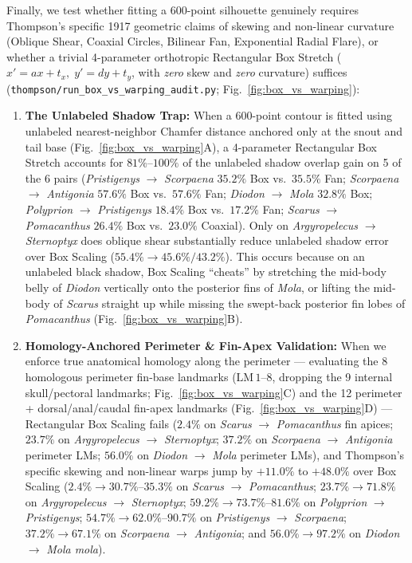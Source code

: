 \documentclass[11pt,a4paper]{article}
\theoremstyle{definition}
\theoremstyle{remark}
\begin{document}
Finally, we test whether fitting a 600-point silhouette genuinely requires Thompson's specific 1917 geometric claims of skewing and non-linear curvature (Oblique Shear, Coaxial Circles, Bilinear Fan, Exponential Radial Flare), or whether a trivial 4-parameter orthotropic Rectangular Box Stretch ($x' = a x + t_x,\; y' = d y + t_y$, with \emph{zero} skew and \emph{zero} curvature) suffices (\texttt{thompson/run\_box\_vs\_warping\_audit.py}; Fig.~\ref{fig:box_vs_warping}):
\begin{enumerate}
  \item \textbf{The Unlabeled Shadow Trap:} When a 600-point contour is fitted using unlabeled nearest-neighbor Chamfer distance anchored only at the snout and tail base (Fig.~\ref{fig:box_vs_warping}A), a 4-parameter Rectangular Box Stretch accounts for $81\%\text{--}100\%$ of the unlabeled shadow overlap gain on 5 of the 6 pairs (\emph{Pristigenys} $\to$ \emph{Scorpaena} $35.2\%$ Box vs.\ $35.5\%$ Fan; \emph{Scorpaena} $\to$ \emph{Antigonia} $57.6\%$ Box vs.\ $57.6\%$ Fan; \emph{Diodon} $\to$ \emph{Mola} $32.8\%$ Box; \emph{Polyprion} $\to$ \emph{Pristigenys} $18.4\%$ Box vs.\ $17.2\%$ Fan; \emph{Scarus} $\to$ \emph{Pomacanthus} $26.4\%$ Box vs.\ $23.0\%$ Coaxial). Only on \emph{Argyropelecus} $\to$ \emph{Sternoptyx} does oblique shear substantially reduce unlabeled shadow error over Box Scaling ($55.4\% \to 45.6\% / 43.2\%$). This occurs because on an unlabeled black shadow, Box Scaling ``cheats'' by stretching the mid-body belly of \emph{Diodon} vertically onto the posterior fins of \emph{Mola}, or lifting the mid-body of \emph{Scarus} straight up while missing the swept-back posterior fin lobes of \emph{Pomacanthus} (Fig.~\ref{fig:box_vs_warping}B).
  \item \textbf{Homology-Anchored Perimeter \& Fin-Apex Validation:} When we enforce true anatomical homology along the perimeter --- evaluating the 8 homologous perimeter fin-base landmarks ($\mathrm{LM}\,1\text{--}8$, dropping the 9 internal skull/pectoral landmarks; Fig.~\ref{fig:box_vs_warping}C) and the 12 perimeter + dorsal/anal/caudal fin-apex landmarks (Fig.~\ref{fig:box_vs_warping}D) --- Rectangular Box Scaling fails ($2.4\%$ on \emph{Scarus} $\to$ \emph{Pomacanthus} fin apices; $23.7\%$ on \emph{Argyropelecus} $\to$ \emph{Sternoptyx}; $37.2\%$ on \emph{Scorpaena} $\to$ \emph{Antigonia} perimeter LMs; $56.0\%$ on \emph{Diodon} $\to$ \emph{Mola} perimeter LMs), and Thompson's specific skewing and non-linear warps jump by $\mathbf{+11.0\%}$ to $\mathbf{+48.0\%}$ over Box Scaling ($2.4\% \to \mathbf{30.7\%\text{--}35.3\%}$ on \emph{Scarus} $\to$ \emph{Pomacanthus}; $23.7\% \to \mathbf{71.8\%}$ on \emph{Argyropelecus} $\to$ \emph{Sternoptyx}; $59.2\% \to \mathbf{73.7\%\text{--}81.6\%}$ on \emph{Polyprion} $\to$ \emph{Pristigenys}; $54.7\% \to \mathbf{62.0\%\text{--}90.7\%}$ on \emph{Pristigenys} $\to$ \emph{Scorpaena}; $37.2\% \to \mathbf{67.1\%}$ on \emph{Scorpaena} $\to$ \emph{Antigonia}; and $56.0\% \to \mathbf{97.2\%}$ on \emph{Diodon} $\to$ \emph{Mola mola}).
\end{enumerate}
\end{document}
